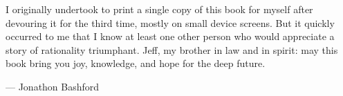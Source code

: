 I originally undertook to print a single copy of this book for myself after devouring it for the third time,
mostly on small device screens.
But it quickly occurred to me that I know at least one other person who would appreciate a story of rationality triumphant.
Jeff, my brother in law and in spirit: may this book bring you joy, knowledge, and hope for the deep future.

— Jonathon Bashford

